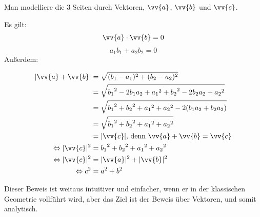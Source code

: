 \begin{Beweis}
  Man modelliere die 3 Seiten durch Vektoren, $\vv{a}$, $\vv{b}$ und $\vv{c}$.

  Es gilt: $$\vv{a} \cdot \vv{b} = 0 $$
  $$ a_1 b_1+a_2 b_2 = 0 $$
  Außerdem:
  \begin{center}
    \begin{align*}
      |\vv{a} + \vv{b}| &= \sqrt{(b_1-a_1)^2+(b_2-a_2)^2}\\
      &= \sqrt{{b_1}^2-2b_1 a_2+{a_1}^2 + {b_2}^2-2b_2 a_2+{a_2}^2}\\
      &= \sqrt{{b_1}^2 + {b_2}^2 + {a_1}^2 + {a_2}^2 -2(b_1 a_2 + b_2 a_2)}\\
      &= \sqrt{{b_1}^2 + {b_2}^2 + {a_1}^2 + {a_2}^2}\\
      &= |\vv{c}| \text{, denn $\vv{a} + \vv{b} = \vv{c}$}\\
      \Leftrightarrow |\vv{c}|^2 &= {b_1}^2 + {b_2}^2 + {a_1}^2 + {a_2}^2\\
      \Leftrightarrow |\vv{c}|^2 &= |\vv{a}|^2 + |\vv{b}|^2\\
      \Leftrightarrow c^2 &= a^2 + b^2\\
    \end{align*}
  \end{center}
\end{Beweis}
\begin{Bemerkung}
  Dieser Beweis ist weitaus intuitiver und einfacher, wenn er in der klassischen Geometrie vollführt wird, aber das Ziel ist der Beweis über Vektoren, und somit analytisch.
\end{Bemerkung}
